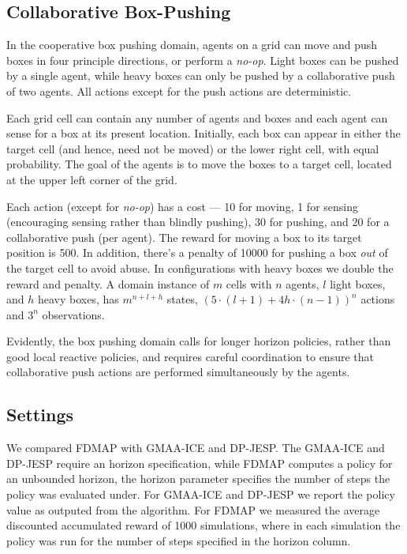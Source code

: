 \documentclass[letterpaper]{article} %
\theoremstyle{definition}
\newcommand{\commentout}[1]{}
\newcommand{\eliran}[1]{\textbf{[\color{red}ELIRAN:#1]}}
\newcommand{\cbp}[0]{Collaborative Box-Pushing}
\begin{document}
\subsection{\cbp}

In the cooperative box pushing domain, agents on a grid can move and push boxes in  four principle directions, 
or perform a {\em no-op}. Light boxes can be pushed by a single agent, while heavy boxes can only be pushed by a collaborative push of two agents. 
All actions except for the push actions are deterministic.

Each grid cell can contain any number of agents and boxes and  each agent can sense for a box at its present location. %
Initially, each box can appear in either the target cell (and hence, need not be moved) or the lower right cell, with equal probability.
The goal of the agents is to move the boxes to a target cell, located at the upper left corner of the grid.
 


 


Each action (except for {\em no-op}) has a cost --- 10 for moving, 1 for sensing (encouraging sensing rather than blindly pushing), 30 for pushing, and 20 for a collaborative push (per agent). The reward for moving a box to its target position is 500. In addition, there's a penalty of 10000 for pushing a box \emph{out} of the target cell to avoid abuse. In configurations with heavy boxes we double the reward and penalty.
A domain instance of $m$ cells with $n$ agents, $l$ light boxes, and $h$ heavy boxes, has $m^{n+l+h}$ states, $(5\cdot(l+1)+4h\cdot(n-1))^n$ actions and $3^n$ observations.

Evidently, the box pushing domain calls for longer horizon policies, rather than good local reactive policies, and requires careful coordination to ensure that collaborative push actions are performed simultaneously by the agents.
 

\subsection{Settings} 

We compared FDMAP with GMAA-ICE and DP-JESP. The GMAA-ICE and DP-JESP require an horizon specification, while FDMAP computes a policy for an unbounded horizon, the horizon parameter specifies the number of steps the policy was evaluated under.
For GMAA-ICE and DP-JESP we report the policy value as outputed from the algorithm. For FDMAP we measured the average discounted accumulated reward of 1000 simulations, where in each simulation the policy was run for the number of steps specified in the horizon column. 
\commentout{
The last horizon prefixed with Max is the maximal horizon measured for reaching the goal state in all simulations.}
\end{document}
